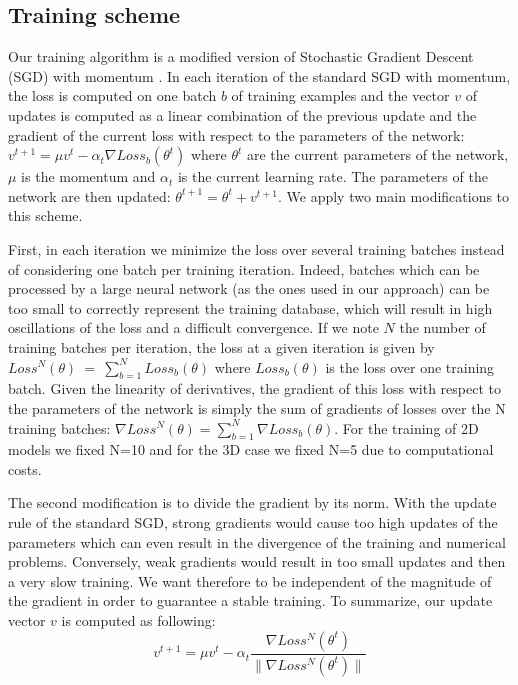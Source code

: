 \documentclass[preprint,12pt]{elsarticle}
\begin{document}
\subsection{Training scheme}
\label{section_training}
Our training algorithm is a modified version of Stochastic Gradient Descent (SGD) with momentum \cite{rumelhart1988learning}. In each iteration of the standard SGD with momentum, the loss is computed on one batch $b$ of training examples and the vector $v$ of updates is computed as a linear combination of the previous update and the gradient of the current loss with respect to the parameters of the network: $ v^{t+1}=\mu v^{t} - \alpha_t \nabla  Loss_b (\theta^{t})  $ where $\theta^{t}$ are the current parameters of the network, $\mu$ is the momentum and $\alpha_t$ is the current learning rate. The parameters of the network are then updated:  $\theta^{t+1}= \theta^{t} + v^{t+1}$. We apply two main modifications to this scheme.


First, in each iteration we minimize the loss over several training batches instead of considering one batch per training iteration. Indeed, batches which can be processed by a large neural network (as the ones used in our approach) can be too small to correctly represent the training database, which will result in high oscillations of the loss and a difficult convergence. If we note $N$ the number of training batches per iteration, the loss at a given iteration is given by $Loss^{N}(\theta)~=~\sum_{b=1}^N Loss_b(\theta)$ where $Loss_b(\theta)$ is the loss over one training batch. Given the linearity of derivatives, the gradient of this loss with respect to the parameters of the network is simply the sum of gradients of losses over the N training batches: $\nabla Loss^{N}(\theta)= \sum_{b=1}^N \nabla Loss_b(\theta)$. For the training of 2D models we fixed N=10 and for the 3D case we fixed N=5 due to computational costs.



The second modification is to divide the gradient by its norm. With the update rule of the standard SGD, strong gradients would cause too high updates of the parameters which can even result in the divergence of the training and numerical problems. Conversely, weak gradients would result in too small updates and then a very slow training. We want therefore to be independent of the magnitude of the gradient in order to guarantee a stable training. To summarize, our update vector $v$ is computed as following: 
\begin{equation}
 v^{t+1}=\mu v^{t} - \alpha_t   \frac{\nabla Loss^{N} (\theta^{t})}{\| \nabla Loss^{N} (\theta^{t}) \|} 
\end{equation}
\end{document}
